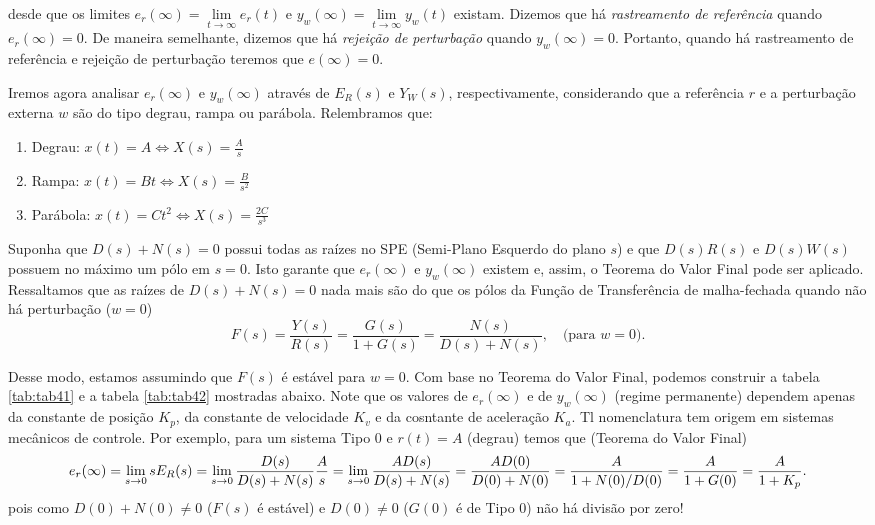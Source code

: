 \documentclass[
]{book}
\providecommand{\tightlist}{%
  \setlength{\itemsep}{0pt}\setlength{\parskip}{0pt}}
\begin{document}
desde que os limites \(e_r(\infty) = \lim\limits_{t\to \infty}{e_r(t)}\) e \(y_w(\infty) = \lim\limits_{t \to \infty}{y_w(t)}\) existam. Dizemos que há \emph{rastreamento de referência} quando \(e_r(\infty) = 0\). De maneira semelhante, dizemos que há \emph{rejeição de perturbação} quando \(y_w(\infty) = 0\). Portanto, quando há rastreamento de referência e rejeição de perturbação teremos que \(e(\infty) = 0\).

Iremos agora analisar \(e_r(\infty)\) e \(y_w(\infty)\) através de \(E_R(s)\) e \(Y_W(s)\), respectivamente, considerando que a referência \(r\) e a perturbação externa \(w\) são do tipo degrau, rampa ou parábola. Relembramos que:

\begin{enumerate}
\def\labelenumi{\arabic{enumi}.}
\tightlist
\item
  Degrau: \(x(t) = A \iff X(s) = \frac {A}{s}\)
\item
  Rampa: \(x(t) = Bt \iff X(s) = \frac {B}{s^2}\)
\item
  Parábola: \(x(t) = Ct^2 \iff X(s) = \frac {2C}{s^3}\)
\end{enumerate}

Suponha que \(D(s) + N(s) = 0\) possui todas as raízes no SPE (Semi-Plano Esquerdo do plano \(s\)) e que \(D(s)R(s)\) e \(D(s)W(s)\) possuem no máximo um pólo em \(s=0\). Isto garante que \(e_r(\infty)\) e \(y_w(\infty)\) existem e, assim, o Teorema do Valor Final pode ser aplicado. Ressaltamos que as raízes de \(D(s) + N(s) = 0\) nada mais são do que os pólos da Função de Transferência de malha-fechada quando não há perturbação (\(w=0\))
\[
F(s) = \frac {Y(s)}{R(s)} = \frac{G(s)}{1+G(s)} = \frac {N(s)}{D(s)+N(s)}, \quad \text{(para } w=0 \text{).} 
\]

Desse modo, estamos assumindo que \(F(s)\) é estável para \(w=0\). Com base no Teorema do Valor Final, podemos construir a tabela \ref{tab:tab41} e a tabela \ref{tab:tab42} mostradas abaixo. Note que os valores de \(e_r(\infty)\) e de \(y_w(\infty)\) (regime permanente) dependem apenas da constante de posição \(K_p\), da constante de velocidade \(K_v\) e da cosntante de aceleração \(K_a\). Tl nomenclatura tem origem em sistemas mecânicos de controle. Por exemplo, para um sistema Tipo 0 e \(r(t)=A\) (degrau) temos que (Teorema do Valor Final)
\[
e_r(\infty) = \lim\limits_{s \to 0}{sE_R(s)}=\lim\limits_{s\to0}{\frac{D(s)}{D(s)+N(s)}\frac{A}{s}} = \lim\limits_{s\to0}{\frac{AD(s)}{D(s)+N(s)}} \\
= \frac{AD(0)}{D(0) + N(0)} = \frac{A}{1+N(0)/D(0)} = \frac{A}{1+G(0)} = \frac {A}{1+K_p}.
\]
pois como \(D(0) + N(0) \neq 0\) (\(F(s)\) é estável) e \(D(0) \neq 0\) (\(G(0)\) é de Tipo 0) não há divisão por zero!
\end{document}

